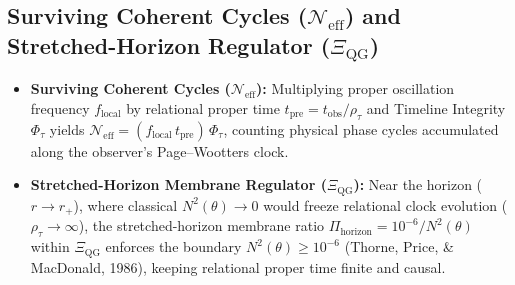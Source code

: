 \documentclass[11pt,a4paper]{article}
\begin{document}
\subsection{Surviving Coherent Cycles ($\mathcal{N}_{\text{eff}}$) and Stretched-Horizon Regulator ($\Xi_{\text{QG}}$)}

\begin{itemize}
    \item \textbf{Surviving Coherent Cycles ($\mathcal{N}_{\text{eff}}$):} Multiplying proper oscillation frequency $f_{\text{local}}$ by relational proper time $t_{\text{pre}} = t_{\text{obs}} / \rho_\tau$ and Timeline Integrity $\Phi_\tau$ yields $\mathcal{N}_{\text{eff}} = (f_{\text{local}}\,t_{\text{pre}})\,\Phi_\tau$, counting physical phase cycles accumulated along the observer's Page--Wootters clock.
    \item \textbf{Stretched-Horizon Membrane Regulator ($\Xi_{\text{QG}}$):} Near the horizon ($r \to r_+$), where classical $N^2(\theta) \to 0$ would freeze relational clock evolution ($\rho_\tau \to \infty$), the stretched-horizon membrane ratio $\Pi_{\text{horizon}} = 10^{-6} / N^2(\theta)$ within $\Xi_{\text{QG}}$ enforces the boundary $N^2(\theta) \ge 10^{-6}$ (Thorne, Price, \& MacDonald, 1986), keeping relational proper time finite and causal.
\end{itemize}
\end{document}
